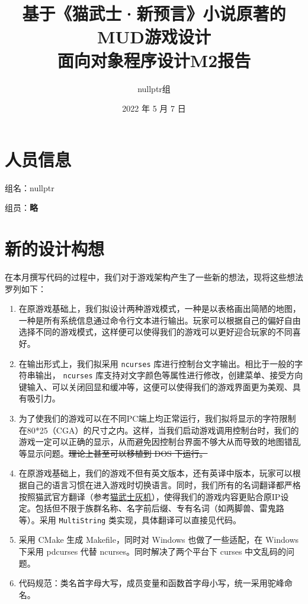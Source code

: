 \documentclass[hyperref,UTF8,a4paper]{ctexart}
\title{基于《猫武士·新预言》小说原著的MUD游戏设计\\
\bigskip \large 面向对象程序设计M2报告}
\author{nullptr组}
\date{2022 年 5 月 7 日}
\begin{document}
\maketitle

\hypertarget{ux4ebaux5458ux4fe1ux606f}{%
\section{人员信息}\label{ux4ebaux5458ux4fe1ux606f}}

组名：nullptr

组员：\textbf{略}

\hypertarget{ux65b0ux7684ux8bbeux8ba1ux6784ux60f3}{%
\section{新的设计构想}\label{ux65b0ux7684ux8bbeux8ba1ux6784ux60f3}}

在本月撰写代码的过程中，我们对于游戏架构产生了一些新的想法，现将这些想法罗列如下：

\begin{enumerate}
\def\labelenumi{\arabic{enumi}.}
\item
  在原游戏基础上，我们拟设计两种游戏模式，一种是以表格画出简陋的地图，一种是所有系统信息通过命令行文本进行输出。玩家可以根据自己的偏好自由选择不同的游戏模式，这样便可以使得我们的游戏可以更好迎合玩家的不同喜好。
\item
  在输出形式上，我们拟采用 \texttt{ncurses}
  库进行控制台文字输出。相比于一般的字符串输出， \texttt{ncurses}
  库支持对文字颜色等属性进行修改，创建菜单、接受方向键输入、可以关闭回显和缓冲等，这便可以使得我们的游戏界面更为美观、具有吸引力。
\item
  为了使我们的游戏可以在不同PC端上均正常运行，我们拟将显示的字符限制在80*25（CGA）的尺寸之内。这样，当我们启动游戏调用控制台时，我们的游戏一定可以正确的显示，从而避免因控制台界面不够大从而导致的地图错乱等显示问题。\sout{理论上甚至可以移植到
  DOS 下运行。}
\item
  在原游戏基础上，我们的游戏不但有英文版本，还有英译中版本，玩家可以根据自己的语言习惯在进入游戏时切换语言。同时，我们所有的名词翻译都严格按照猫武官方翻译（参考\href{https://warriors.huijiwiki.com/}{猫武士灰机}），使得我们的游戏内容更贴合原IP设定。包括但不限于族群名称、名字前后缀、专有名词（如两脚兽、雷鬼路等）。采用
  \texttt{MultiString} 类实现，具体翻译可以直接见代码。
\item
  采用 CMake 生成 Makefile，同时对 Windows 也做了一些适配，在 Windows
  下采用 pdcurses 代替 ncurses。同时解决了两个平台下 curses
  中文乱码的问题。
\item
  代码规范：类名首字母大写，成员变量和函数首字母小写，统一采用驼峰命名。
\end{enumerate}
\end{document}
